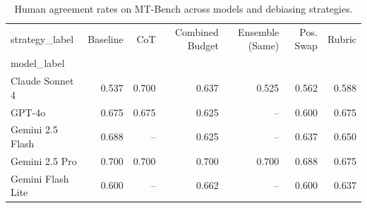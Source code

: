 \begin{table}
\caption{Human agreement rates on MT-Bench across models and debiasing strategies.}
\label{tab:main_results}
\begin{tabular}{lrrrrrr}
\toprule
strategy_label & Baseline & CoT & Combined Budget & Ensemble (Same) & Pos. Swap & Rubric \\
model_label &  &  &  &  &  &  \\
\midrule
Claude Sonnet 4 & 0.537 & 0.700 & 0.637 & 0.525 & 0.562 & 0.588 \\
GPT-4o & 0.675 & 0.675 & 0.625 & -- & 0.600 & 0.675 \\
Gemini 2.5 Flash & 0.688 & -- & 0.625 & -- & 0.637 & 0.650 \\
Gemini 2.5 Pro & 0.700 & 0.700 & 0.700 & 0.700 & 0.688 & 0.675 \\
Gemini Flash Lite & 0.600 & -- & 0.662 & -- & 0.600 & 0.637 \\
\bottomrule
\end{tabular}
\end{table}
